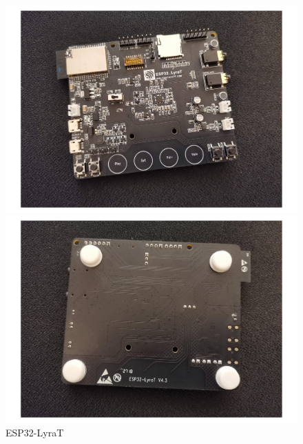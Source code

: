 \documentclass[thesis=M,english]{FITthesis}[2019/12/23]
\begin{document}
\iftrue
\begin{figure}[H]
\centering
\begin{minipage}{.5\textwidth}
  \centering
  \includegraphics[width=1\linewidth]{images/ESP32-LyraT-1.pdf}
\end{minipage}%
\begin{minipage}{.5\textwidth}
  \centering
  \includegraphics[width=1\linewidth]{images/ESP32-LyraT-2.pdf}
\end{minipage}
\caption{ESP32-LyraT}
\label{esp32-lyrat}
\end{figure}
\fi
\end{document}
